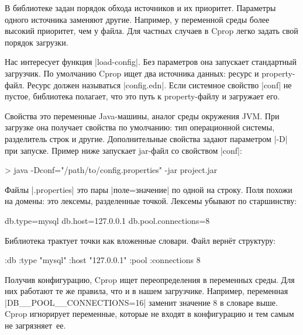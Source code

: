 В библиотеке задан порядок обхода источников и их приоритет. Параметры одного
источника заменяют другие. Например, у переменной среды более высокий приоритет,
чем у файла. Для частных случаев в Cprop легко задать свой порядок загрузки.

Нас интересует функция \spverb|load-config|. Без параметров она запускает
стандартный загрузчик. По умолчанию Cprop ищет два источника данных: ресурс и
property-файл. Ресурс должен называться \spverb|config.edn|. Если системное
свойство \spverb|conf| не пустое, библиотека полагает, что это путь к
property-файлу и загружает его.

Свойства это переменные Java-машины, аналог среды окружения JVM. При загрузке
она получает свойства по умолчанию: тип операционной системы, разделитель строк
и другие. Дополнительные свойства задают параметром \spverb|-D| при
запуске. Пример ниже запускает jar-файл со свойством \spverb|conf|:

\begin{english}
  \begin{bash}
> java -Dconf="/path/to/config.properties" -jar project.jar
  \end{bash}
\end{english}

Файлы \spverb|.properties| это пары \spverb|поле=значение| по одной на
строку. Поля похожи на домены: это лексемы, разделенные точкой. Лексемы убывают
по старшинству:

\begin{english}
  \begin{ini}
db.type=mysql
db.host=127.0.0.1
db.pool.connections=8
  \end{ini}
\end{english}

Библиотека трактует точки как вложенные словари. Файл верн\"{е}т структуру:

\begin{english}
  \begin{clojure}
{:db {:type "mysql"
      :host "127.0.0.1"
      :pool {:connections 8}}}
  \end{clojure}
\end{english}

Получив конфигурацию, Cprop ищет переопределения в переменных среды. Для них
работают те же правила, что и в нашем загрузчике. Например, переменная
\spverb|DB__POOL__CONNECTIONS=16| заменит значение 8 в словаре выше. Cprop
игнорирует переменные, которые не входят в конфигурацию и тем самым не
загрязняет~ее.

